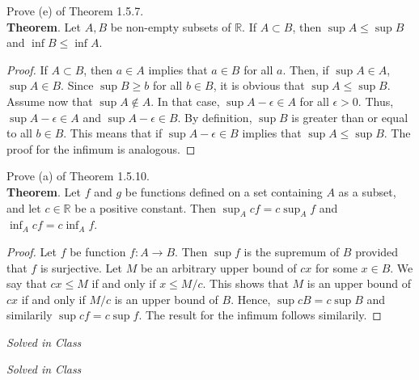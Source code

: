 \documentclass[12pt]{article}
\newenvironment{exercise}[2][Exercise]{\begin{trivlist}
\item[\hskip \labelsep {\bfseries #1}\hskip \labelsep {\bfseries #2.}]}{\end{trivlist}}
\begin{document}
\begin{exercise}{1.5.7}
Prove (e) of Theorem 1.5.7. \\

\textbf{Theorem}. Let $A,B$ be non-empty subsets of $\mathbb{R}$. If $A \subset B$, then $\sup A \leq \sup B$ and $\inf B \leq \inf A$.
	\begin{proof}
	If $A \subset B$, then $a \in A$ implies that $a \in B$ for all $a$. Then, if $\sup A \in A$, $\sup A \in B$. Since $\sup B \geq b$ for all $b \in B$, it is obvious that $\sup A \leq \sup B$. Assume now that $\sup A \notin A$. In that case, $\sup A - \epsilon \in A$ for all $\epsilon > 0$. Thus, $\sup A - \epsilon \in A$ and $\sup A - \epsilon \in B$. By definition, $\sup B$ is greater than or equal to all $b \in B$. This means  that if $\sup A - \epsilon \in B$ implies that $\sup A \leq \sup B$. The proof for the infimum is analogous.
	\end{proof}
\end{exercise}

\begin{exercise}{1.5.10}
Prove (a) of Theorem 1.5.10. \\

\textbf{Theorem}. Let $f$ and $g$ be functions defined on a set containing $A$ as a subset, and let $c \in \mathbb{R}$ be a positive constant. Then $\sup_A c f= c \sup_A f$ and $\inf_A c f = c \inf_A f$.
	\begin{proof}
	Let $f$ be function $f: A \to B$. Then $\sup f$ is the supremum of $B$ provided that $f$ is surjective. Let $M$ be an arbitrary upper bound of $cx$ for some $x \in B$. We say that $c x \leq M$ if and only if $x \leq M/c$. This shows that $M$ is an upper bound of $c x$ if and only if $M/c$ is an upper bound of $B$. Hence, $\sup c B = c \sup B$ and similarily $\sup c f = c \sup f$. The result for the infimum follows similarily.
	\end{proof}
\end{exercise}

\begin{exercise}{1.5.8}
\emph{Solved in Class}
\end{exercise}

\begin{exercise}{1.5.9}
\emph{Solved in Class}
\end{exercise}
\end{document}
